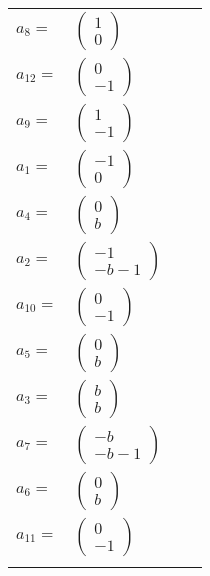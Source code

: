 \documentclass[1p]{elsarticle_modified}
\theoremstyle{definition}
\begin{document}
\begin{tabular}{m{7pt} m{180pt} m{7pt} m{180pt} }
\flushright $a_{8}=$&$\begin{pmatrix}1\\0\end{pmatrix}$ \\
\flushright $a_{12}=$&$\begin{pmatrix}0\\-1\end{pmatrix}$ \\
\flushright $a_{9}=$&$\begin{pmatrix}1\\-1\end{pmatrix}$ \\
\flushright $a_{1}=$&$\begin{pmatrix}-1\\0\end{pmatrix}$ \\
\flushright $a_{4}=$&$\begin{pmatrix}0\\b\end{pmatrix}$ \\
\flushright $a_{2}=$&$\begin{pmatrix}-1\\- b-1\end{pmatrix}$ \\
\flushright $a_{10}=$&$\begin{pmatrix}0\\-1\end{pmatrix}$ \\
\flushright $a_{5}=$&$\begin{pmatrix}0\\b\end{pmatrix}$ \\
\flushright $a_{3}=$&$\begin{pmatrix}b\\b\end{pmatrix}$ \\
\flushright $a_{7}=$&$\begin{pmatrix}- b\\- b-1\end{pmatrix}$ \\
\flushright $a_{6}=$&$\begin{pmatrix}0\\b\end{pmatrix}$ \\
\flushright $a_{11}=$&$\begin{pmatrix}0\\-1\end{pmatrix}$\\&\end{tabular}
\end{document}
